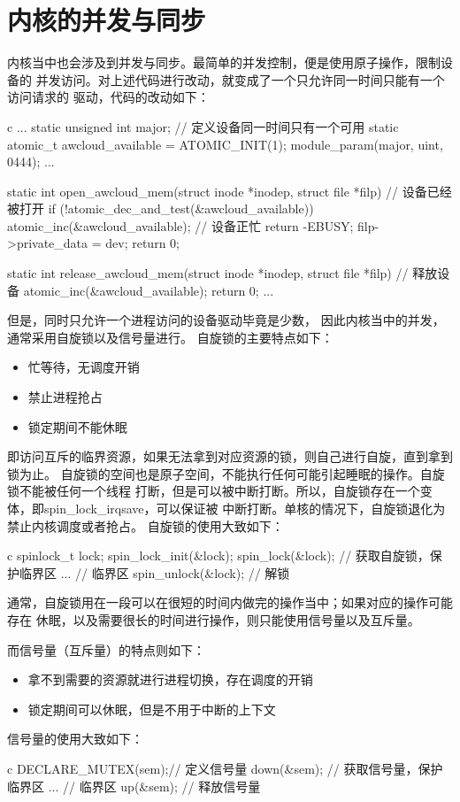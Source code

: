\section{内核的并发与同步}
内核当中也会涉及到并发与同步。最简单的并发控制，便是使用原子操作，限制设备的
并发访问。对上述代码进行改动，就变成了一个只允许同一时间只能有一个访问请求的
驱动，代码的改动如下：
\begin{code-block}{c}
...
static unsigned int major;
// 定义设备同一时间只有一个可用
static atomic_t awcloud_available = ATOMIC_INIT(1);
module_param(major, uint, 0444);
...

static int open_awcloud_mem(struct inode *inodep, struct file *filp)
{
        // 设备已经被打开
        if (!atomic_dec_and_test(&awcloud_available)) {
                atomic_inc(&awcloud_available);
                // 设备正忙
                return -EBUSY;
        }
        filp->private_data = dev;
        return 0;
}

static int release_awcloud_mem(struct inode *inodep, struct file *filp)
{
        // 释放设备
        atomic_inc(&awcloud_available);
        return 0;
}
...
\end{code-block}

但是，同时只允许一个进程访问的设备驱动毕竟是少数，
因此内核当中的并发，通常采用自旋锁以及信号量进行。
自旋锁的主要特点如下：
\begin{itemize}
  \item 忙等待，无调度开销
  \item 禁止进程抢占
  \item 锁定期间不能休眠
\end{itemize}
即访问互斥的临界资源，如果无法拿到对应资源的锁，则自己进行自旋，直到拿到锁为止。
自旋锁的空间也是原子空间，不能执行任何可能引起睡眠的操作。自旋锁不能被任何一个线程
打断，但是可以被中断打断。所以，自旋锁存在一个变体，即spin\_lock\_irqsave，可以保证被
中断打断。单核的情况下，自旋锁退化为禁止内核调度或者抢占。
自旋锁的使用大致如下：
\begin{code-block}{c}
spinlock_t lock;
spin_lock_init(&lock);
spin_lock(&lock);   // 获取自旋锁，保护临界区
...                 // 临界区
spin_unlock(&lock); // 解锁
\end{code-block}
通常，自旋锁用在一段可以在很短的时间内做完的操作当中；如果对应的操作可能存在
休眠，以及需要很长的时间进行操作，则只能使用信号量以及互斥量。

而信号量（互斥量）的特点则如下：
\begin{itemize}
  \item 拿不到需要的资源就进行进程切换，存在调度的开销
  \item 锁定期间可以休眠，但是不用于中断的上下文
\end{itemize}
信号量的使用大致如下：
\begin{code-block}{c}
DECLARE_MUTEX(sem);// 定义信号量
down(&sem); // 获取信号量，保护临界区
... // 临界区
up(&sem); // 释放信号量
\end{code-block}

